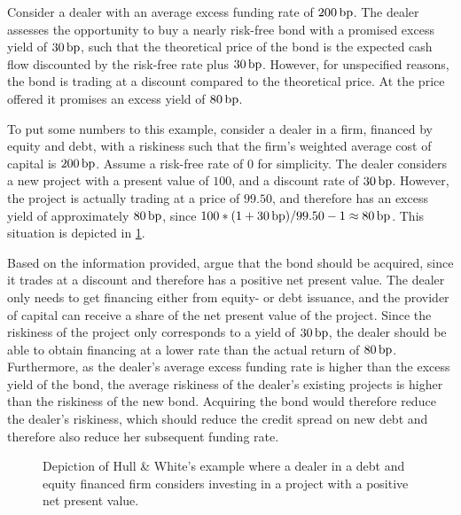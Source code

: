 \documentclass[main.tex]{subfiles}
\begin{document}
            \begin{example}
            Consider a dealer with an average excess funding rate of $200\,\text{bp}$. 
            The dealer assesses the opportunity to buy a nearly risk-free bond with a promised excess yield of $30\,\text{bp}$,
            such that the theoretical price of the bond is the expected cash flow 
            discounted by the risk-free rate plus $30\,\text{bp}$.
            However, for unspecified reasons, the bond is trading at a discount compared to the theoretical price.
            At the price offered it promises an excess yield of $80\,\text{bp}$.
            
            To put some numbers to this example,
            consider a dealer in a firm,
            financed by equity and debt, 
            with a riskiness such that the firm's weighted average cost of capital is $200\,\text{bp}$.
            Assume a risk-free rate of $0$ for simplicity.
            The dealer considers a new project with a present value of $100$,
            and a discount rate of $30\,\text{bp}$.
            However, the project is actually trading at a price of $99.50$,
            and therefore has an excess yield of approximately $80\,\text{bp}$,
            since $100*(1+30\,\text{bp}) / 99.50 - 1 \approx 80\,\text{bp}$.
            This situation is depicted in \cref{fig:hw-example}.

            Based on the information provided, \textcite{HullWhite2012FVA} argue that the bond should be acquired,
            since it trades at a discount and therefore has a positive net present value.
            The dealer only needs to get financing either from equity- or debt issuance,
            and the provider of capital can receive a share of the net present value of the project.
            Since the riskiness of the project only corresponds to a yield of $30\,\text{bp}$,
            the dealer should be able to obtain financing at a lower rate 
            than the actual return of $80\,\text{bp}$.
            Furthermore, as the dealer's average excess funding rate is higher than the excess yield of the bond, 
            the average riskiness of the dealer's existing projects is higher than the riskiness of the new bond.
            Acquiring the bond would therefore reduce the dealer's riskiness,
            which should reduce the credit spread on new debt and therefore also reduce her subsequent funding rate.
            \end{example}

            \begin{figure}
                \centering
                \resizebox{10cm}{!}{%
                \begin{tikzpicture}
                    
                \end{tikzpicture}        
                }   
                \caption{
                    Depiction of Hull \& White's example where a dealer in a debt and equity financed firm
                    considers investing in a project with a positive net present value.
                }
                \label{fig:hw-example}
            \end{figure}
            
\end{document}
